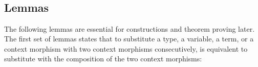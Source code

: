 \documentclass{acm_proc_article-sp}
\begin{document}
{\begin{code}
\>[48]\<%
\\
\>[0]\<[8]%
\>[8]        \<[25]%
\>[25]\<%
\\
\>[0]\<[8]%
\>[8]  \AgdaSymbol{\{\_\}} \AgdaSymbol{\{}  \AgdaSymbol{(} \AgdaInductiveConstructor{,} \AgdaSymbol{)\}} \AgdaSymbol{(} \AgdaInductiveConstructor{,} \AgdaSymbol{)} \AgdaSymbol{(} \AgdaInductiveConstructor{,} \AgdaSymbol{)}\<%
\\
\>  \AgdaSymbol{(} \AgdaSymbol{\_)} \AgdaSymbol{=} \<%
\\
\>\<%
\end{code}
}


\subsection{Lemmas}

The following lemmas are essential for constructions and theorem
proving later.  The first set of lemmas states that to substitute a
type, a variable, a term, or a context morphism with two context
morphisms consecutively, is equivalent to substitute with the
composition of the two context morphisms:
\end{document}
